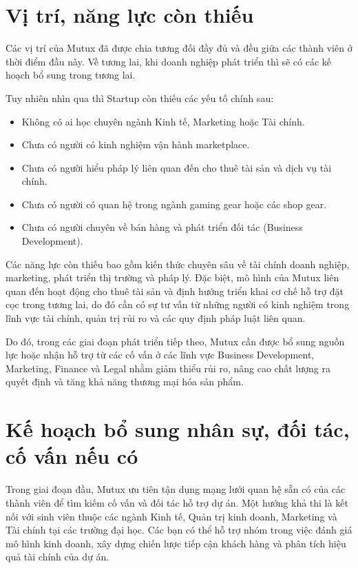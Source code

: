 \section{Vị trí, năng lực còn thiếu}
Các vị trí của Mutux đã được chia tương đối đầy đủ và đều giữa các thành viên ở thời điểm đầu này. Về tương lai, khi doanh nghiệp phát triển thì sẽ có các kế hoạch bổ sung trong tương lai.

Tuy nhiên nhìn qua thì Startup còn thiếu các yếu tố chính sau:
\begin{itemize}
    \item Không có ai học chuyên ngành Kinh tế, Marketing hoặc Tài chính.
    \item Chưa có người có kinh nghiệm vận hành marketplace.
    \item Chưa có người hiểu pháp lý liên quan đến cho thuê tài sản và dịch vụ tài chính.
    \item Chưa có người có quan hệ trong ngành gaming gear hoặc các shop gear.
    \item Chưa có người chuyên về bán hàng và phát triển đối tác (Business Development).
\end{itemize}

Các năng lực còn thiếu bao gồm kiến thức chuyên sâu về tài chính doanh nghiệp, marketing, phát triển thị trường và pháp lý. Đặc biệt, mô hình của Mutux liên quan đến hoạt động cho thuê tài sản và định hướng triển khai cơ chế hỗ trợ đặt cọc trong tương lai, do đó cần có sự tư vấn từ những người có kinh nghiệm trong lĩnh vực tài chính, quản trị rủi ro và các quy định pháp luật liên quan.

Do đó, trong các giai đoạn phát triển tiếp theo, Mutux cần được bổ sung nguồn lực hoặc nhận hỗ trợ từ các cố vấn ở các lĩnh vực Business Development, Marketing, Finance và Legal nhằm giảm thiểu rủi ro, nâng cao chất lượng ra quyết định và tăng khả năng thương mại hóa sản phẩm.

\section{Kế hoạch bổ sung nhân sự, đối tác, cố vấn nếu có}
Trong giai đoạn đầu, Mutux ưu tiên tận dụng mạng lưới quan hệ sẵn có của các thành viên để tìm kiếm cố vấn và đối tác hỗ trợ dự án. Một hướng khả thi là kết nối với sinh viên thuộc các ngành Kinh tế, Quản trị kinh doanh, Marketing và Tài chính tại các trường đại học. Các bạn có thể hỗ trợ nhóm trong việc đánh giá mô hình kinh doanh, xây dựng chiến lược tiếp cận khách hàng và phân tích hiệu quả tài chính của dự án.

